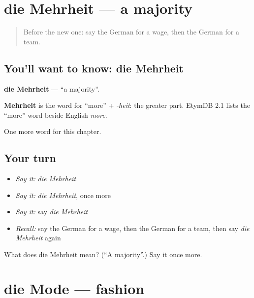 \section[die Mehrheit]{die Mehrheit — a majority}

\label{lesson:GE-C234-mehrheit}



\begin{quote}
Before the new one: say the German for a wage, then the German for a team.
\end{quote}

\subsection*{You'll want to know: die Mehrheit}
\textbf{die Mehrheit} — \textquotedblleft{}a majority\textquotedblright{}.

\begin{cousinweb}
\textbf{Mehrheit} is the word for \textquotedblleft{}more\textquotedblright{} + \emph{-heit}: the greater part. EtymDB 2.1 lists the \textquotedblleft{}more\textquotedblright{} word beside English \emph{more}.
\end{cousinweb}

\begin{grammarlens}[title={What you've built}]
One more word for this chapter.
\end{grammarlens}

\subsection*{Your turn}
\begin{itemize}
\raggedright
  \item \emph{Say it:} \emph{die Mehrheit}
  \item \emph{Say it:} \emph{die Mehrheit}, once more
  \item \emph{Say it:} say \emph{die Mehrheit}
  \item \emph{Recall:} say the German for a wage, then the German for a team, then say \emph{die Mehrheit} again
\end{itemize}

\begin{tcolorbox}[breakable,colback=teal!4,colframe=teal!35!black,title={Before you move on}]
What does die Mehrheit mean? (\textquotedblleft{}A majority\textquotedblright{}.) Say it once more.
\end{tcolorbox}
\section[die Mode]{die Mode — fashion}

